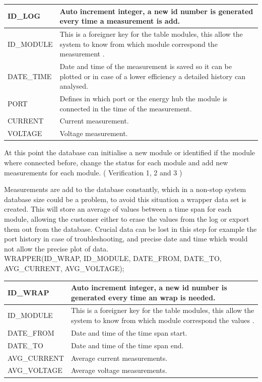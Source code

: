 \begin{table}[H]
\centering
	\begin{tabular}{| p{2cm} | p{10cm} |}
		\hline
		ID\_LOG & Auto increment integer, a new id number is generated every time a measurement is add. \\\hline
		ID\_MODULE & This is a foreigner key for the table modules, this allow the system to know from which module correspond the measurement .\\\hline
		DATE\_TIME & Date and time of the measurement is saved so it can be plotted or in case of a lower efficiency a detailed history can analysed. \\\hline
		PORT & Defines in which port or the energy hub the module is connected in the time of the measurement. \\\hline
		CURRENT & Current measurement. \\\hline
		VOLTAGE & Voltage measurement. \\\hline
	\end{tabular}
\end{table}

At this point the database can initialise a new module or identified if the module where connected before, change the status for each module and add new measurements for each module. ( Verification 1, 2 and 3 )

Measurements are add to the database constantly, which in a non-stop system database size could be a problem, to avoid this situation a wrapper data set is created. This will store an average of values between a time span for each module, allowing the customer either to erase the values from the log or export them out from the database. Crucial data can be lost in this step for example the port history in case of troubleshooting, and precise date and time which would not allow the precise plot of data.\\


WRAPPER(ID\_WRAP, ID\_MODULE, DATE\_FROM, DATE\_TO, AVG\_CURRENT, AVG\_VOLTAGE);

\begin{table}[H]
\centering
	\begin{tabular}{| l | p{10cm} |}
		\hline
		ID\_WRAP & Auto increment integer, a new id number is generated every time an wrap is needed. \\\hline
		ID\_MODULE & This is a foreigner key for the table modules, this allow the system to know from which module correspond the values .\\\hline
		DATE\_FROM & Date and time of the time span start. \\\hline
		DATE\_TO & Date and time of the time span end. \\\hline
		AVG\_CURRENT & Average current measurements. \\\hline
		AVG\_VOLTAGE & Average voltage measurements. \\\hline
	\end{tabular}
\end{table}

